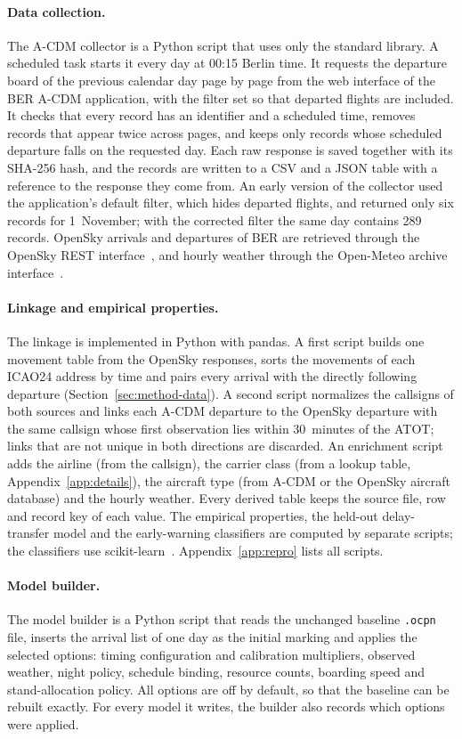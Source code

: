 \paragraph{Data collection.}
The A-CDM collector is a Python script that uses only the standard library. A scheduled task starts it every day at 00:15 Berlin time. It requests the departure board of the previous calendar day page by page from the web interface of the BER A-CDM application, with the filter set so that departed flights are included. It checks that every record has an identifier and a scheduled time, removes records that appear twice across pages, and keeps only records whose scheduled departure falls on the requested day. Each raw response is saved together with its SHA-256 hash, and the records are written to a CSV and a JSON table with a reference to the response they come from. An early version of the collector used the application's default filter, which hides departed flights, and returned only six records for 1~November; with the corrected filter the same day contains 289 records. OpenSky arrivals and departures of BER are retrieved through the OpenSky REST interface~\cite{opensky_rest}, and hourly weather through the Open-Meteo archive interface~\cite{openmeteo}.

\paragraph{Linkage and empirical properties.}
The linkage is implemented in Python with pandas. A first script builds one movement table from the OpenSky responses, sorts the movements of each ICAO24 address by time and pairs every arrival with the directly following departure (Section~\ref{sec:method-data}). A second script normalizes the callsigns of both sources and links each A-CDM departure to the OpenSky departure with the same callsign whose first observation lies within 30~minutes of the ATOT; links that are not unique in both directions are discarded. An enrichment script adds the airline (from the callsign), the carrier class (from a lookup table, Appendix~\ref{app:details}), the aircraft type (from A-CDM or the OpenSky aircraft database) and the hourly weather. Every derived table keeps the source file, row and record key of each value. The empirical properties, the held-out delay-transfer model and the early-warning classifiers are computed by separate scripts; the classifiers use scikit-learn~\cite{pedregosa2011sklearn}. Appendix~\ref{app:repro} lists all scripts.

\paragraph{Model builder.}
The model builder is a Python script that reads the unchanged baseline \texttt{.ocpn} file, inserts the arrival list of one day as the initial marking and applies the selected options: timing configuration and calibration multipliers, observed weather, night policy, schedule binding, resource counts, boarding speed and stand-allocation policy. All options are off by default, so that the baseline can be rebuilt exactly. For every model it writes, the builder also records which options were applied.

